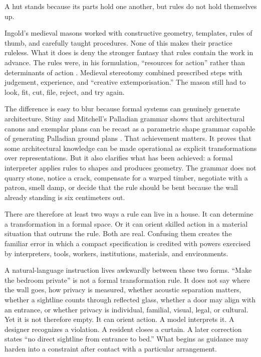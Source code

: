 \documentclass[11pt]{article}
\begin{document}
A hut stands because its parts hold one another, but rules do not hold themselves up.

Ingold's medieval masons worked with constructive geometry, templates, rules of thumb, and carefully taught procedures. None of this makes their practice ruleless. What it does is deny the stronger fantasy that rules contain the work in advance. The rules were, in his formulation, ``resources for action'' rather than determinants of action \cite{ingold2013}. Medieval stereotomy combined prescribed steps with judgement, experience, and ``creative extemporisation.'' The mason still had to look, fit, cut, file, reject, and try again.

The difference is easy to blur because formal systems can genuinely generate architecture. Stiny and Mitchell's Palladian grammar shows that architectural canons and exemplar plans can be recast as a parametric shape grammar capable of generating Palladian ground plans \cite{stiny1978}. That achievement matters. It proves that some architectural knowledge can be made operational as explicit transformations over representations. But it also clarifies what has been achieved: a formal interpreter applies rules to shapes and produces geometry. The grammar does not quarry stone, notice a crack, compensate for a warped timber, negotiate with a patron, smell damp, or decide that the rule should be bent because the wall already standing is six centimeters out.

There are therefore at least two ways a rule can live in a house. It can determine a transformation in a formal space. Or it can orient skilled action in a material situation that outruns the rule. Both are real. Confusing them creates the familiar error in which a compact specification is credited with powers exercised by interpreters, tools, workers, institutions, materials, and environments.

A natural-language instruction lives awkwardly between these two forms. ``Make the bedroom private'' is not a formal transformation rule. It does not say where the wall goes, how privacy is measured, whether acoustic separation matters, whether a sightline counts through reflected glass, whether a door may align with an entrance, or whether privacy is individual, familial, visual, legal, or cultural. Yet it is not therefore empty. It can orient action. A model interprets it. A designer recognizes a violation. A resident closes a curtain. A later correction states ``no direct sightline from entrance to bed.'' What begins as guidance may harden into a constraint after contact with a particular arrangement.
\end{document}
